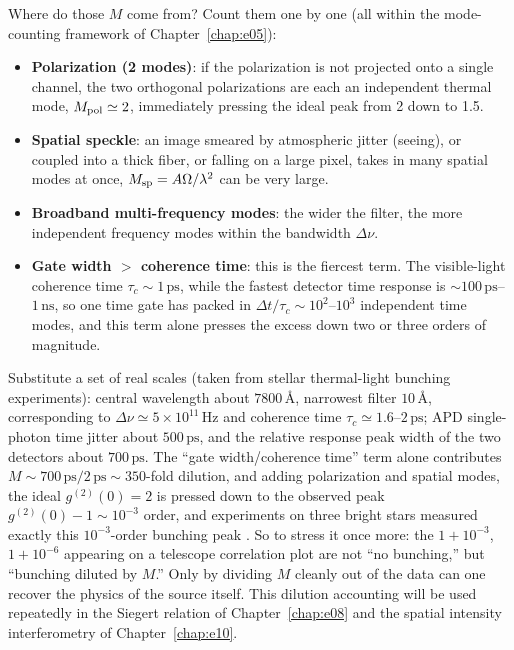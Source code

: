 Where do those \(M\) come from? Count them one by one (all within the mode-counting framework of Chapter~\ref{chap:e05}):

\begin{itemize}
  \item \textbf{Polarization (2 modes)}: if the polarization is not projected onto a single channel, the two orthogonal polarizations are each an independent thermal mode, \(M_{\rm pol}\simeq2\), immediately pressing the ideal peak from 2 down to 1.5.
  \item \textbf{Spatial speckle}: an image smeared by atmospheric jitter (seeing), or coupled into a thick fiber, or falling on a large pixel, takes in many spatial modes at once, \(M_{\rm sp}=A\Omega/\lambda^2\) can be very large.
  \item \textbf{Broadband multi-frequency modes}: the wider the filter, the more independent frequency modes within the bandwidth \(\Delta\nu\).
  \item \textbf{Gate width \(>\) coherence time}: this is the fiercest term. The visible-light coherence time \(\tau_c\sim1\,\mathrm{ps}\), while the fastest detector time response is \(\sim100\,\mathrm{ps}\)--\(1\,\mathrm{ns}\), so one time gate has packed in \(\Delta t/\tau_c\sim10^2\)--\(10^3\) independent time modes, and this term alone presses the excess down two or three orders of magnitude.
\end{itemize}

Substitute a set of real scales (taken from stellar thermal-light bunching experiments): central wavelength about \(7800\,\text{\AA}\), narrowest filter \(10\,\text{\AA}\), corresponding to \(\Delta\nu\simeq5\times10^{11}\,\mathrm{Hz}\) and coherence time \(\tau_c\simeq1.6\)--\(2\,\mathrm{ps}\); APD single-photon time jitter about \(500\,\mathrm{ps}\), and the relative response peak width of the two detectors about \(700\,\mathrm{ps}\). The ``gate width/coherence time'' term alone contributes \(M\sim700\,\mathrm{ps}/2\,\mathrm{ps}\sim350\)-fold dilution, and adding polarization and spatial modes, the ideal \(g^{(2)}(0)=2\) is pressed down to the observed peak \(g^{(2)}(0)-1\sim10^{-3}\) order, and experiments on three bright stars measured exactly this \(10^{-3}\)-order bunching peak \citep{2017MNRAS.472.4126G}. So to stress it once more: the \(1+10^{-3}\), \(1+10^{-6}\) appearing on a telescope correlation plot are not ``no bunching,'' but ``bunching diluted by \(M\).'' Only by dividing \(M\) cleanly out of the data can one recover the physics of the source itself. This dilution accounting will be used repeatedly in the Siegert relation of Chapter~\ref{chap:e08} and the spatial intensity interferometry of Chapter~\ref{chap:e10}.

